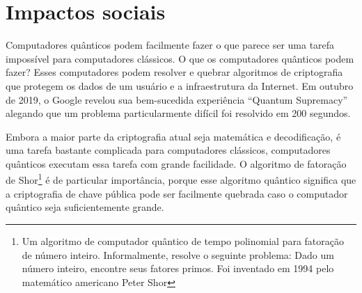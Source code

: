 \section{Impactos sociais}
Computadores quânticos podem facilmente fazer o que parece ser uma tarefa impossível para computadores clássicos. O que os computadores quânticos podem fazer? Esses computadores podem resolver e quebrar algoritmos de criptografia que protegem os dados de um usuário e a infraestrutura da Internet. Em outubro de 2019, o Google revelou sua bem-sucedida experiência ``Quantum Supremacy'' alegando que um problema particularmente difícil foi resolvido em 200 segundos.

Embora a maior parte da criptografia atual seja matemática e decodificação, é uma tarefa bastante complicada para computadores clássicos, computadores quânticos executam essa tarefa com grande facilidade. O algoritmo de fatoração de Shor\footnote{Um algoritmo de computador quântico de tempo polinomial para fatoração de número inteiro. Informalmente, resolve o seguinte problema: Dado um número inteiro, encontre seus fatores primos. Foi inventado em 1994 pelo matemático americano Peter Shor} é de particular importância, porque esse algoritmo quântico significa que a criptografia de chave pública pode ser facilmente quebrada caso o computador quântico seja suficientemente grande.